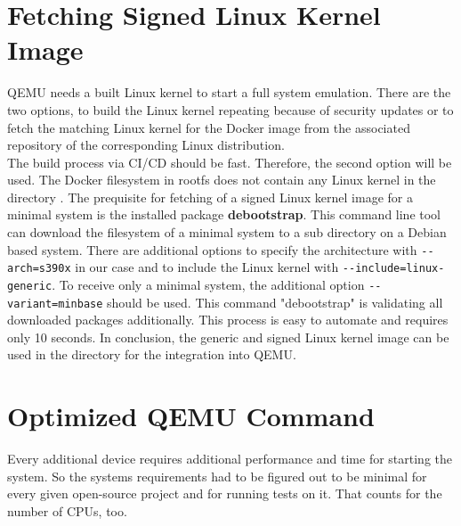 \section{Fetching Signed Linux Kernel Image}

QEMU needs a built Linux kernel to start a full system emulation. There are the two options, to build the Linux kernel repeating because of security updates or to fetch the matching Linux kernel for the Docker image from the associated repository of the corresponding Linux distribution. \\ 
The build process via CI/CD should be fast. Therefore, the second option will be used. The Docker filesystem in rootfs does not contain any Linux kernel in the directory .
The prequisite for fetching of a signed Linux kernel image for a minimal system is the installed package \textbf{debootstrap}. This command line tool can download the filesystem of a minimal system to a sub directory on a Debian based system. There are additional options to specify the architecture with \lstinline!--arch=s390x! in our case and to include the Linux kernel with \lstinline!--include=linux-generic!. To receive only a minimal system, the additional option \lstinline!--variant=minbase! should be used. This command "debootstrap" is validating all downloaded packages additionally. This process is easy to automate and requires only 10 seconds. In conclusion, the generic and signed Linux kernel image can be used in the  directory for the integration into QEMU.
 

\section{Optimized QEMU Command}\label{Optimized-Qemu-Command}

Every additional device requires additional performance and time for starting the system. 
So the systems requirements had to be figured out to be minimal for every given open-source project and for running tests on it. 
That counts for the number of CPUs, too. \\

